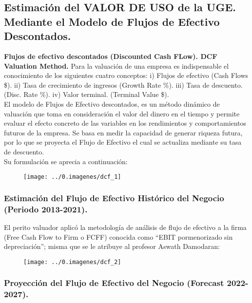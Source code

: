 \subsection{Estimación del VALOR DE USO de la UGE.  Mediante el Modelo de Flujos de Efectivo Descontados.}

\textcolor{principal}{\textbf{Flujos de efectivo descontados (Discounted Cash FLow). DCF Valuation Method.}} Para la valuación de una empresa es indispensable el conocimiento de los siguientes cuatro conceptos: i) Flujos de efectivo (Cash Flows \$). ii) Tasa de crecimiento de ingresos (Growth Rate \%). iii) Tasa de descuento. (Disc. Rate \%). iv) Valor terminal. (Terminal Value \$).\\

El modelo de Flujos de Efectivo descontados, es un método dinámico de valuación que toma en consideración el valor del dinero en el tiempo y permite evaluar el efecto concreto de las variables en los rendimientos y comportamientos futuros de la empresa. Se basa en medir la capacidad de generar riqueza futura, por lo que se proyecta el Flujo de Efectivo el cual se actualiza mediante su tasa de descuento. \\

Su formulación se aprecia a continuación:

\begin{figure}[H]
\centering
\texttt{[image: ../0.imagenes/dcf\_1]}
\end{figure}

\subsubsection{Estimación del Flujo de Efectivo Histórico del Negocio (Periodo 2013-2021).}

El perito valuador aplicó la metodología de análisis de flujo de efectivo a la firma (Free Cash Flow to Firm o FCFF) conocida como ``EBIT pormenorizado sin depreciación''; misma que se le atribuye al profesor Aswath Damodaran:

\begin{figure}[H]
\centering
\texttt{[image: ../0.imagenes/dcf\_2]}
\end{figure}

\newpage

\subsubsection{Proyección del Flujo de Efectivo del Negocio (Forecast 2022-2027).}

